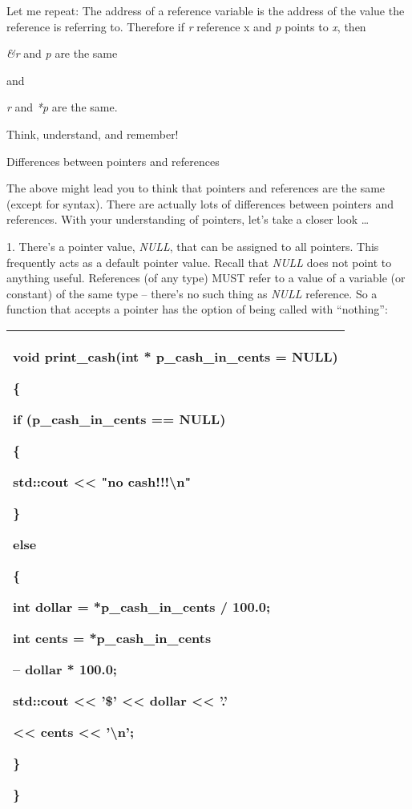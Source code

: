 \documentclass[
]{article}
\begin{document}
Let me repeat: The address of a reference variable is the address of the
value the reference is referring to. Therefore if \emph{r} reference x
and \emph{p} points to \emph{x}, then

\emph{\&r} and \emph{p }are the same

and

\emph{r} and \emph{*p }are the same.

Think, understand, and remember!

Differences between pointers and references

The above might lead you to think that pointers and references are the
same (except for syntax). There are actually lots of differences between
pointers and references. With your understanding of pointers, let's take
a closer look \ldots{}

1. There's a pointer value, \emph{NULL}, that can be assigned to all
pointers. This frequently acts as a default pointer value. Recall that
\emph{NULL} does not point to anything useful. References (of any type)
MUST refer to a value of a variable (or constant) of the same type --
there's no such thing as \emph{NULL} reference. So a function that
accepts a pointer has the option of being called with ``nothing'':

\begin{longtable}[]{@{}l@{}}
\toprule
\endhead
\begin{minipage}[t]{0.97\columnwidth}\raggedright
void print\_cash(int * p\_cash\_in\_cents = NULL)

\{

if (p\_cash\_in\_cents == NULL)

\{

std::cout \textless\textless{} "no cash!!!\textbackslash n"

\}

else

\{

int dollar = *p\_cash\_in\_cents / 100.0;

int cents = *p\_cash\_in\_cents

-- dollar * 100.0;

std::cout \textless\textless{} '\$' \textless\textless{} dollar
\textless\textless{} '.'

\textless\textless{} cents \textless\textless{} '\textbackslash n';

\}

\}\strut
\end{minipage}\tabularnewline
\bottomrule
\end{longtable}
\end{document}
